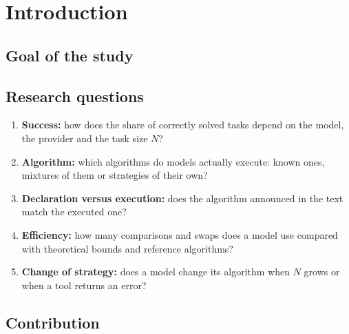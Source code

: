 \section{Introduction}
\label{sec:introduction}


\subsection{Goal of the study}
\label{sec:goal}


\subsection{Research questions}
\label{sec:questions}

\begin{enumerate}
  \item \textbf{Success:} how does the share of correctly solved tasks depend on the model, the provider and the task
    size $N$?
  \item \textbf{Algorithm:} which algorithms do models actually execute: known ones, mixtures of them or strategies
    of their own?
  \item \textbf{Declaration versus execution:} does the algorithm announced in the text match the executed one?
  \item \textbf{Efficiency:} how many comparisons and swaps does a model use compared with theoretical bounds and
    reference algorithms?
  \item \textbf{Change of strategy:} does a model change its algorithm when $N$ grows or when a tool returns an error?
\end{enumerate}

\subsection{Contribution}
\label{sec:contribution}

